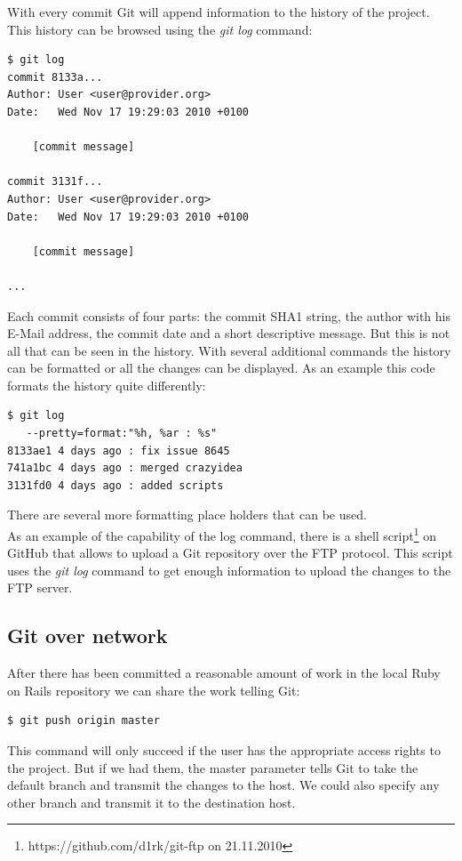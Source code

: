 With every commit Git will append information to the history of the project. This history
can be browsed using the \emph {git log} command:

\begin{lstlisting}
$ git log
commit 8133a...
Author: User <user@provider.org>
Date:   Wed Nov 17 19:29:03 2010 +0100

    [commit message]
    
commit 3131f...
Author: User <user@provider.org>
Date:   Wed Nov 17 19:29:03 2010 +0100

    [commit message]
    
...
\end{lstlisting}

Each commit consists of four parts: the commit SHA1 string, the author with his E-Mail address, the commit date and a short descriptive message.
But this is not all that can be seen in the history. With several additional commands the history can be formatted or all the changes can be displayed.
As an example this code formats the history quite differently:

\begin{lstlisting}
$ git log 
   --pretty=format:"%h, %ar : %s"
8133ae1 4 days ago : fix issue 8645
741a1bc 4 days ago : merged crazyidea
3131fd0 4 days ago : added scripts
\end{lstlisting}

There are several more formatting place holders that can be used. \cite[chapter 2.4]{gitpro2009} \\

As an example of the capability of the log command, there is a shell script\footnote{https://github.com/d1rk/git-ftp on 21.11.2010} on GitHub that allows to upload a Git repository over the FTP protocol. This script uses the \emph{git log} command to get enough information to upload the changes to the FTP server. 

\subsection{Git over network}

After there has been committed a reasonable amount of work in the local Ruby on Rails
repository we can share the work telling Git:

\begin{lstlisting}
$ git push origin master 
\end{lstlisting}

This command will only succeed if the user has the appropriate access rights to the
project. But if we had them, the master parameter tells Git to take the default
branch and transmit the changes to the host. We could also specify any other
branch and transmit it to the destination host. \\ 

